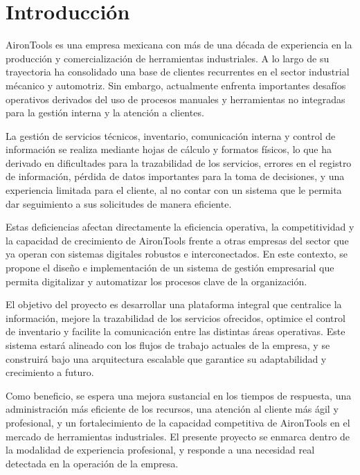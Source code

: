 \pagestyle{fancy}
\section{Introducción}

AironTools es una empresa mexicana con más de una década de experiencia en la producción y comercialización de herramientas industriales. A lo largo de su trayectoria ha consolidado una base de clientes recurrentes en el sector industrial mécanico y automotriz. Sin embargo, actualmente enfrenta importantes desafíos operativos derivados del uso de procesos manuales y herramientas no integradas para la gestión interna y la atención a clientes.

La gestión de servicios técnicos, inventario, comunicación interna y control de información se realiza mediante hojas de cálculo y formatos físicos, lo que ha derivado en dificultades para la trazabilidad de los servicios, errores en el registro de información, pérdida de datos importantes para la toma de decisiones, y una experiencia limitada para el cliente, al no contar con un sistema que le permita dar seguimiento a sus solicitudes de manera eficiente.

Estas deficiencias afectan directamente la eficiencia operativa, la competitividad y la capacidad de crecimiento de AironTools frente a otras empresas del sector que ya operan con sistemas digitales robustos e interconectados. En este contexto, se propone el diseño e implementación de un sistema de gestión empresarial que permita digitalizar y automatizar los procesos clave de la organización.

El objetivo del proyecto es desarrollar una plataforma integral que centralice la información, mejore la trazabilidad de los servicios ofrecidos, optimice el control de inventario y facilite la comunicación entre las distintas áreas operativas. Este sistema estará alineado con los flujos de trabajo actuales de la empresa, y se construirá bajo una arquitectura escalable que garantice su adaptabilidad y crecimiento a futuro.

Como beneficio, se espera una mejora sustancial en los tiempos de respuesta, una administración más eficiente de los recursos, una atención al cliente más ágil y profesional, y un fortalecimiento de la capacidad competitiva de AironTools en el mercado de herramientas industriales. El presente proyecto se enmarca dentro de la modalidad de experiencia profesional, y responde a una necesidad real detectada en la operación de la empresa.

